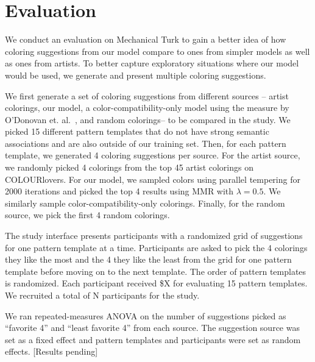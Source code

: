 \section{Evaluation}
\label{sec:evaluation}


We conduct an evaluation on Mechanical Turk to gain a better idea of how coloring suggestions from our model compare to ones from simpler models as well as ones from artists.
To better capture exploratory situations where our model would be used, we generate and present multiple coloring suggestions.

We first generate a set of coloring suggestions from different sources -- artist colorings, our model, a color-compatibility-only model using the measure by O'Donovan et. al.~, and random colorings-- to be compared in the study. We picked 15 different pattern templates that do not have strong semantic associations and are also outside of our training set. Then, for each pattern template, we generated 4 coloring suggestions per source. For the artist source, we randomly picked 4 colorings from the top 45 artist colorings on COLOURlovers. For our model, we sampled colors using parallel tempering for 2000 iterations and picked the top 4 results using MMR with $\lambda = 0.5$. We similarly sample color-compatibility-only colorings. Finally, for the random source, we pick the first 4 random colorings.

The study interface presents participants with a randomized grid of suggestions for one pattern template at a time. Participants are asked to pick the 4 colorings they like the most and the 4 they like the least from the grid for one pattern template before moving on to the next template. The order of pattern templates is randomized. Each participant received \$X for evaluating 15 pattern templates. We recruited a total of N participants for the study.


We ran repeated-measures ANOVA on the number of suggestions picked as ``favorite 4'' and ``least favorite 4'' from each source. The suggestion source was set as a fixed effect and pattern templates and participants were set as random effects. [Results pending]